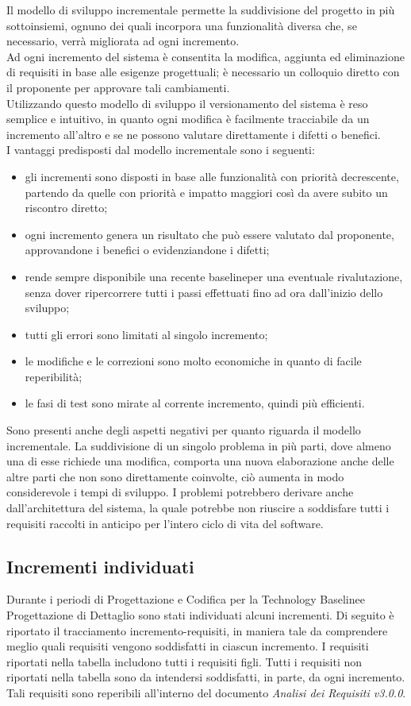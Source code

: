 Il modello di sviluppo incrementale permette la suddivisione del progetto in più sottoinsiemi,
ognuno dei quali incorpora una funzionalità diversa che, se necessario, verrà migliorata ad ogni incremento.  \\
Ad ogni incremento del sistema è consentita la modifica, aggiunta ed eliminazione di requisiti in base alle esigenze progettuali; 
è necessario un colloquio diretto con il proponente per approvare tali cambiamenti. \\
Utilizzando questo modello di sviluppo il versionamento del sistema è reso semplice e intuitivo, in quanto ogni modifica è facilmente tracciabile da un incremento all'altro e se ne possono valutare direttamente i difetti o benefici.\\
I vantaggi predisposti dal modello incrementale sono i seguenti:
\begin{itemize}
	\item gli incrementi sono disposti in base alle funzionalità con priorità decrescente, partendo da quelle con priorità e impatto maggiori
	così da avere subito un riscontro diretto;
	\item ogni incremento genera un risultato che può essere valutato dal proponente, approvandone i benefici o evidenziandone i difetti;
	\item rende sempre disponibile una recente baseline\glosp per una eventuale rivalutazione, senza dover ripercorrere tutti i passi effettuati fino ad ora dall'inizio dello sviluppo;
	\item tutti gli errori sono limitati al singolo incremento;
	\item le modifiche e le correzioni sono molto economiche in quanto di facile reperibilità;
	\item le fasi di test sono mirate al corrente incremento, quindi più efficienti.
\end{itemize}
Sono presenti anche degli aspetti negativi per quanto riguarda il modello incrementale. La suddivisione di un singolo problema in più parti, dove almeno una di esse richiede una modifica, comporta una nuova elaborazione anche delle altre parti che non sono direttamente coinvolte, ciò aumenta in modo considerevole i tempi di sviluppo.
I problemi potrebbero derivare anche dall'architettura del sistema, la quale potrebbe non riuscire a soddisfare tutti i requisiti raccolti in anticipo per l'intero ciclo di vita del software.

\subsection{Incrementi individuati}
Durante i periodi di Progettazione e Codifica per la Technology Baseline\glosp e Progettazione di Dettaglio sono stati individuati alcuni incrementi. Di seguito è riportato il tracciamento incremento-requisiti, in maniera tale da comprendere meglio quali requisiti vengono soddisfatti in ciascun incremento. I requisiti riportati nella tabella includono tutti i requisiti figli. Tutti i requisiti non riportati nella tabella sono da intendersi soddisfatti, in parte, da ogni incremento. Tali requisiti sono reperibili all’interno del documento \textit{Analisi dei Requisiti v3.0.0}.


